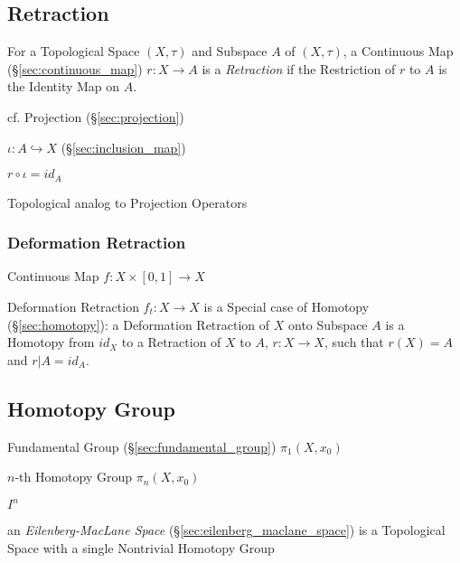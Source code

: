 \subsection{Retraction}\label{sec:subspace_retraction}

For a Topological Space $(X, \tau)$ and Subspace $A$ of $(X,\tau)$, a
Continuous Map (\S\ref{sec:continuous_map}) $r : X \rightarrow A$ is a
\emph{Retraction} if the Restriction of $r$ to $A$ is the Identity Map
on $A$.

cf. Projection (\S\ref{sec:projection})

$\iota : A \hookrightarrow X$ (\S\ref{sec:inclusion_map})

$r \circ \iota = id_A$

Topological analog to Projection Operators %
\cite{hatcher02}



\subsubsection{Deformation Retraction}\label{sec:deformation_retraction}

Continuous Map $f : X \times [0,1] \rightarrow X$

Deformation Retraction $f_t : X \rightarrow X$ is a Special case of
Homotopy (\S\ref{sec:homotopy}): a Deformation Retraction of $X$ onto
Subspace $A$ is a Homotopy from $id_X$ to a Retraction of $X$ to $A$,
$r : X \rightarrow X$, such that $r(X) = A$ and $r | A = id_A$.
\cite{hatcher02}



\subsection{Homotopy Group}\label{sec:homotopy_group}

Fundamental Group (\S\ref{sec:fundamental_group}) $\pi_1(X,x_0)$

$n$-th Homotopy Group $\pi_n(X,x_0)$

$I^n$

an \emph{Eilenberg-MacLane Space} (\S\ref{sec:eilenberg_maclane_space}) is a
Topological Space with a single Nontrivial Homotopy Group



